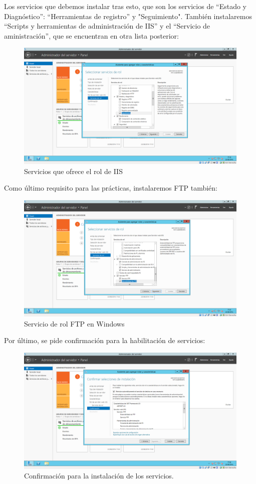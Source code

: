 \begin{itemize}
	Los servicios que debemos instalar tras esto, que son los servicios de “Estado y Diagnóstico”: “Herramientas de registro” y "Seguimiento". También instalaremos “Scripts y herramientas de administración de IIS” y el “Servicio de aministración”, que se encuentran en otra lista posterior:\\
		
	\begin{figure}[H]
		\centering
		\includegraphics[width=0.7\linewidth]{ServiciosDeRol}
		\caption[Servicios de rol]{Servicios que ofrece el rol de IIS}
		\label{fig:ServiciosDeRol}
	\end{figure}
	
	Como último requisito para las prácticas, instalaremos FTP también:\\
		
	\begin{figure}[H]
		\centering
		\includegraphics[width=0.7\linewidth]{FTPWS}
		\caption[Servicio FTP]{Servicio de rol FTP en Windows}
		\label{fig:FTPWS}
	\end{figure}
	
	Por último, se pide confirmación para la habilitación de servicios:\\
	
	\begin{figure}[H]
		\centering
		\includegraphics[width=0.7\linewidth]{ConfirmacionInstalacionWS}
		\caption[Confirmación Instalacion]{Confirmación para la instalación de los servicios.}
		\label{fig:ConfirmacionInstalacionWS}
	\end{figure}


\end{itemize}
